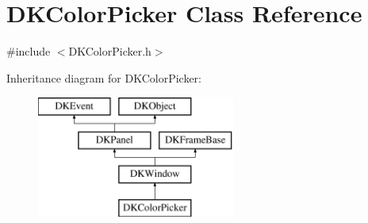 \hypertarget{class_d_k_color_picker}{\section{D\-K\-Color\-Picker Class Reference}
\label{class_d_k_color_picker}
}


{\ttfamily \#include $<$D\-K\-Color\-Picker.\-h$>$}

Inheritance diagram for D\-K\-Color\-Picker\-:\begin{figure}[H]
\begin{center}
\leavevmode
\includegraphics[height=4.000000cm]{class_d_k_color_picker}
\end{center}
\end{figure}
